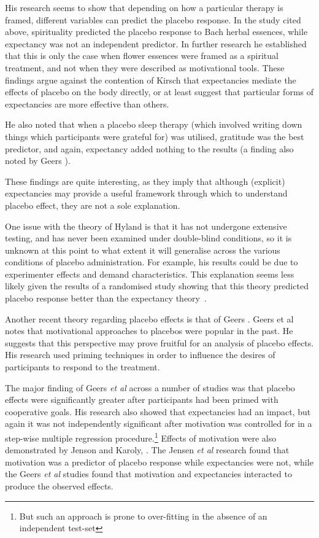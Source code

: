 His research seems to show that depending on how a particular therapy is framed, different variables can predict the placebo response.  In the study cited above, spirituality predicted the placebo response to Bach herbal essences, while expectancy was not an independent predictor. In further research \cite{Hyland2007} he established that this is only the case when flower essences were framed as a spiritual treatment, and not when they were described as motivational tools. These findings argue against the contention of Kirsch that expectancies mediate the effects of placebo on the body directly, or at least suggest that particular forms of expectancies are more effective than others. 

He also noted that when a placebo sleep therapy (which involved writing down things which participants were grateful for) was utilised, gratitude was the best predictor, and again, expectancy added nothing to the results (a finding also noted by Geers \cite{Geers2005}). 

These findings are quite interesting, as they imply that although (explicit) expectancies may provide a useful framework through which to understand placebo effect, they are not a sole explanation. 


One issue with the theory of Hyland is that it has not undergone extensive testing, and has never been examined under double-blind conditions, so it is unknown at this point to what extent it will generalise across the various conditions of placebo administration. For example, his results could be due to experimenter effects and demand characteristics. This explanation seems less likely given the results of a randomised study showing that this theory predicted placebo response better than the expectancy theory~\cite{gaitan2011nonspecific}. 

Another recent theory regarding placebo effects is that of Geers \cite{Geers2005a}. Geers et al notes that  motivational approaches to placebos were popular in the past.  He suggests that this perspective may prove fruitful for an analysis of placebo effects.   His research used priming techniques in order to influence the desires of  participants to respond to the treatment. 

The major finding of Geers \textit{et al} across a number of studies \cite{Geers2007,Geers2005a} was that placebo effects were significantly greater after participants had been primed with cooperative goals. His research also showed that expectancies had an impact, but again it was not independently significant after motivation was controlled for in a step-wise multiple regression procedure.\footnote{But such an approach is prone to over-fitting in the absence of an independent test-set} Effects of motivation were also demonstrated by Jenson and Karoly, \cite{Jensen1991}. The Jensen \textit{et al }   research found that motivation was a predictor of placebo response while expectancies were not, while the Geers \textit{et al } studies found that motivation and expectancies interacted to produce the observed effects.

